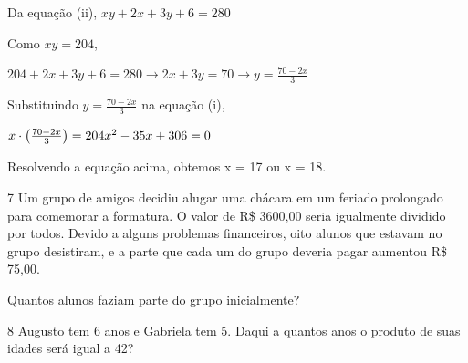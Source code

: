 {{{\begin{escolha}
{{Da equação (ii),
$xy + 2x + 3y + 6 = 280$

Como $xy =204$,

$204 + 2x + 3y + 6 = 280 \rightarrow
2x + 3y = 70 \rightarrow
y = \frac{70-2x}{3}$

Substituindo $y = \frac{70-2x}{3}$ na equação (i),

$x \cdot \left ( \frac{70-2x}{3} \right ) = 204

x\textsuperscript{2} - 35x + 306 = 0$

Resolvendo a equação acima, obtemos x = 17 ou x = 18.}

\num{7} Um grupo de amigos decidiu alugar uma chácara em um feriado
prolongado para comemorar a formatura. O valor de R\$ 3600,00 seria igualmente
dividido por todos. Devido a alguns problemas financeiros, oito alunos
que estavam no grupo desistiram, e a parte que cada um do grupo deveria
pagar aumentou R\$ 75,00.

Quantos alunos faziam parte do grupo inicialmente?



\num{8} Augusto tem 6 anos e Gabriela tem 5. Daqui a quantos anos o produto
de suas idades será igual a 42?



}
\end{escolha}}}}
